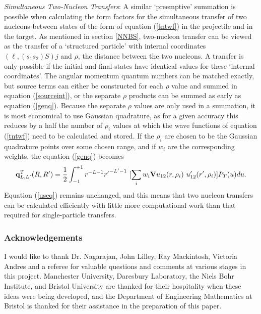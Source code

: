 \documentclass[11pt,a4paper]{article}
\newcommand{\half}{\frac{1}{2}}
\begin{document}
{\em Simultaneous Two-Nucleon Transfers}:
A similar `preemptive' summation is possible when calculating the
form factors for the simultaneous transfer of two nucleons between states
of the form of equation (\ref{tntwf}) in the projectile and in the target.
As mentioned in section \ref{NNBS},
two-nucleon transfer can be viewed as the transfer of a
`structured particle' with internal coordinates
$ ( \ell , (s_1 s_2) S)j $ and
$\rho$, the distance between the two nucleons.  A transfer is only possible
if the initial and final states have identical values for these `internal
coordinates'. The angular momentum quantum numbers can be matched
exactly, but source terms can either be constructed for each $\rho$
value and summed in equation (\ref{sourceint}),
or the separate $\rho$ products can be summed as early as equation (\ref{genq}).
Because the separate $\rho$ values are only used in a summation,
it is most economical to use Gaussian quadrature,
as for a given accuracy this reduces by a half
the number of $\rho_i$ values at which the wave functions of equation
(\ref{tntwf}) need to be calculated and stored.
If the $\rho_i$ are chosen to be the Gaussian quadrature points over
some chosen range, and if $ w_i $ are the corresponding weights,
the equation (\ref{genq}) becomes
\begin{eqnarray}
 {\bf q}^T_ {L , L'} (R,R')  =
   \half \int_ {-1}^{+1}
         r^{-L-1} {r'}^{-L' -1} ~
        [ \sum _ i  w_i {\bf V} u_{12} (r, \rho_i) ~
                                   u'_{12} (r' , \rho_i) ]
              P_T (u) du.
\end{eqnarray}
Equation (\ref{useq}) remains unchanged, and this means that two nucleon
transfers can be calculated efficiently with little more computational work
than that required for single-particle transfers.
\subsubsection*{Acknowledgements}

I would like to thank Dr. Nagarajan, John Lilley, Ray Mackintosh,
Victoria Andres and a referee for valuable questions and comments at various stages
in this project.
Manchester University, Daresbury Laboratory, the Niels Bohr Institute, and
Bristol University are thanked for their hospitality when these ideas were
being developed, and the Department of Engineering Mathematics at Bristol
is thanked for their assistance in the preparation of this paper.
\end{document}
